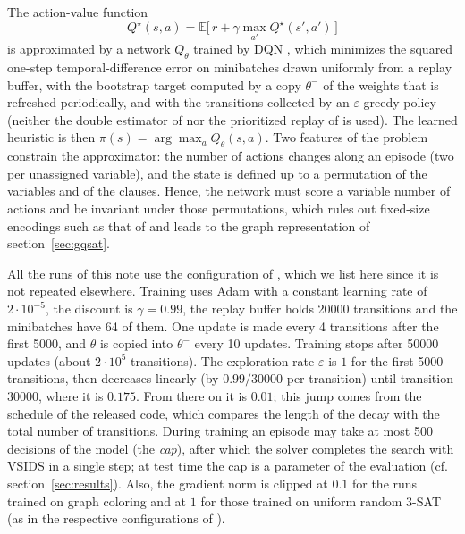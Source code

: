 \documentclass[11pt,a4paper]{article}
\begin{document}
\smallskip
\noindent
The action-value function
\begin{equation}\label{eq:bellman}
  Q^\star(s,a) = \mathbb{E}\big[\,r + \gamma \max_{a'} Q^\star(s',a')\,\big]
\end{equation}
is approximated by a network $Q_\theta$ trained by DQN \cite{Mnih2015}, which
minimizes the squared one-step temporal-difference error on minibatches drawn
uniformly from a replay buffer, with the bootstrap target computed by a copy
$\theta^-$ of the weights that is refreshed periodically, and with the
transitions collected by an $\varepsilon$-greedy policy (neither the double
estimator of \cite{vanHasselt2016} nor the prioritized replay of
\cite{Schaul2016} is used). The learned heuristic is then
$\pi(s) = \arg\max_a Q_\theta(s,a)$. Two features of the problem constrain the
approximator: the number of actions changes along an episode (two per
unassigned variable), and the state is defined up to a permutation of the
variables and of the clauses. Hence, the network must score a variable
number of actions and be invariant under those permutations, which rules out
fixed-size encodings such as that of \cite{WangRompf2018} and leads to the
graph representation of section~\ref{sec:gqsat}.

\smallskip
\noindent
All the runs of this note use the configuration of \cite{Kurin2020}, which we
list here since it is not repeated elsewhere. Training uses Adam with a
constant learning rate of $2\cdot 10^{-5}$, the discount is $\gamma = 0.99$,
the replay buffer holds 20000 transitions and the minibatches have 64 of them.
One update is made every 4 transitions after the first 5000, and $\theta$ is copied
into $\theta^-$ every 10 updates. Training stops after 50000 updates (about
$2\cdot 10^{5}$ transitions). The exploration rate $\varepsilon$ is $1$ for the
first 5000 transitions, then decreases linearly (by $0.99/30000$ per
transition) until transition 30000, where it is $0.175$. From there on it is
$0.01$; this jump comes from the schedule of the released code, which compares
the length of the decay with the total number of transitions. During training
an episode may take at most 500 decisions of the model (the \emph{cap}), after
which the solver completes the search with VSIDS in a single step; at test
time the cap is a parameter of the evaluation (cf. section~\ref{sec:results}).
Also, the gradient norm is clipped at $0.1$
for the runs trained on graph coloring and at $1$ for those trained on uniform
random 3-SAT (as in the respective configurations of \cite{Kurin2020}).
\end{document}
